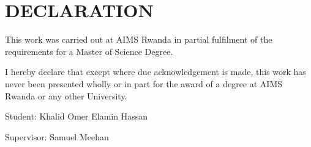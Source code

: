 \chapter*{DECLARATION}
This work was carried out at AIMS Rwanda in partial fulfilment of the requirements for a Master of Science Degree.

I hereby declare that except where due acknowledgement is made, this work has never been presented wholly or in part for the award of a degree at AIMS Rwanda or any other University.

\vspace{1.5cm}

Student: Khalid Omer Elamin Hassan
\vspace{1.5cm}

Supervisor: Samuel Meehan


%
%
%
%
